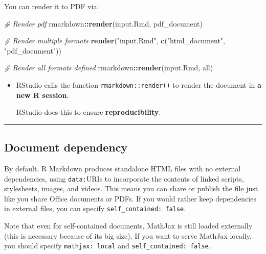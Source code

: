\documentclass[
  a4paper,
  twoside,
  openright]{book}
\newenvironment{Shaded}{\begin{snugshade}}{\end{snugshade}}
\newcommand{\CommentTok}[1]{\textcolor[rgb]{0.56,0.35,0.01}{\textit{#1}}}
\newcommand{\FunctionTok}[1]{\textcolor[rgb]{0.13,0.29,0.53}{\textbf{#1}}}
\newcommand{\NormalTok}[1]{#1}
\newcommand{\SpecialCharTok}[1]{\textcolor[rgb]{0.81,0.36,0.00}{\textbf{#1}}}
\newcommand{\StringTok}[1]{\textcolor[rgb]{0.31,0.60,0.02}{#1}}
\theoremstyle{definition}
\theoremstyle{definition}
\theoremstyle{definition}
\theoremstyle{definition}
\theoremstyle{remark}
\begin{document}
You can render it to PDF via:

\begin{Shaded}
\begin{Highlighting}[]
\CommentTok{\# Render pdf}
\NormalTok{rmarkdown}\SpecialCharTok{::}\FunctionTok{render}\NormalTok{(}\StringTok{\textquotesingle{}input.Rmd\textquotesingle{}}\NormalTok{, }\StringTok{\textquotesingle{}pdf\_document\textquotesingle{}}\NormalTok{)}

\CommentTok{\# Render multiple formats}
\FunctionTok{render}\NormalTok{(}\StringTok{"input.Rmd"}\NormalTok{, }\FunctionTok{c}\NormalTok{(}\StringTok{"html\_document"}\NormalTok{, }\StringTok{"pdf\_document"}\NormalTok{))}

\CommentTok{\# Render all formats defined}
\NormalTok{rmarkdown}\SpecialCharTok{::}\FunctionTok{render}\NormalTok{(}\StringTok{\textquotesingle{}input.Rmd\textquotesingle{}}\NormalTok{, }\StringTok{\textquotesingle{}all\textquotesingle{}}\NormalTok{)}
\end{Highlighting}
\end{Shaded}

\begin{itemize}
\item
  RStudio calls the function \texttt{rmarkdown::render()} to render the document in \textbf{a new R session}.

  RStudio does this to ensure \textbf{reproducibility}.
\end{itemize}

\begin{center}\rule{0.5\linewidth}{0.5pt}\end{center}

\subsection{Document dependency}\label{document-dependency}

By default, R Markdown produces standalone HTML files with no external dependencies, using \texttt{data:}URIs to incorporate the contents of linked scripts, stylesheets, images, and videos. This means you can share or publish the file just like you share Office documents or PDFs. If you would rather keep dependencies in external files, you can specify \texttt{self\_contained:\ false}.

Note that even for self-contained documents, MathJax is still loaded externally (this is necessary because of its big size). If you want to serve MathJax locally, you should specify \texttt{mathjax:\ local} and \texttt{self\_contained:\ false}.
\end{document}
